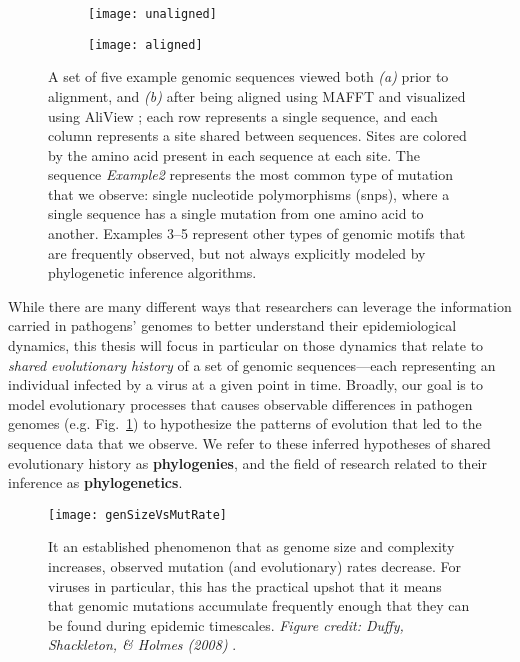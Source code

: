 \begin{figure}[ht]
  \centering
  \begin{subfigure}{0.95\textwidth}
    \texttt{[image: unaligned]}
    \caption{}
  \end{subfigure}
  \begin{subfigure}{0.95\textwidth}
    \texttt{[image: aligned]}
    \caption{}
  \end{subfigure}
  \caption[Multiple sequence alignment]{A set of five example genomic sequences viewed both \textit{(a)} prior to alignment, and \textit{(b)} after being aligned using MAFFT \citep{katoh2013mafft} and visualized using AliView \citep{larsson2014aliview}; each row represents a single sequence, and each column represents a site shared between sequences. Sites are colored by the amino acid present in each sequence at each site. The sequence \textit{Example2} represents the most common type of mutation that we observe: single nucleotide polymorphisms (\gls{snp}s), where a single sequence has a single mutation from one amino acid to another. Examples 3--5 represent other types of genomic motifs that are frequently observed, but not always explicitly modeled by phylogenetic inference algorithms.}
  \label{fig:alignment}
\end{figure}

While there are many different ways that researchers can leverage the information carried in pathogens' genomes to better understand their epidemiological dynamics, this thesis will focus in particular on those dynamics that relate to \textit{shared evolutionary history} of a set of genomic sequences---each representing an individual infected by a virus at a given point in time.
Broadly, our goal is to model evolutionary processes that causes observable differences in pathogen genomes (e.g. Fig.~\ref{fig:alignment}) to hypothesize the patterns of evolution that led to the sequence data that we observe.
We refer to these inferred hypotheses of shared evolutionary history as \textbf{phylogenies}, and the field of research related to their inference as \textbf{phylogenetics}.

\begin{figure}[ht]
  \centering
  \texttt{[image: genSizeVsMutRate]}
  \caption[Genome size vs. mutation rate in viruses.]{It an established phenomenon that as genome size and complexity increases, observed mutation (and evolutionary) rates decrease. For viruses in particular, this has the practical upshot that it means that genomic mutations accumulate frequently enough that they can be found during epidemic timescales. \textit{Figure credit: Duffy, Shackleton, \& Holmes (2008)} \citep{duffy2008rates}.}
  \label{fig:sizeVsRates}
\end{figure}

